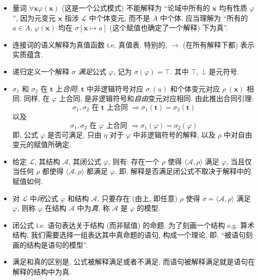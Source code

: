 \documentclass[a4paper]{article}
\begin{document}
\begin{itemize}
    \item 量词 $\forall \mathbf{x} \varphi(\mathbf{x})$ (这是一个公式模式) 不能解释为 ``论域中所有的 $\mathbf{x}$ 均有性质 $\varphi$'', 因为元变元 $\mathbf{x}$ 指涉 $\mathcal{L}$ 中个体变元, 而不是 $A$ 中个体. 应当理解为 ``所有的 $a\in A$, $\varphi(\mathbf{x})$ 均在 $\sigma[\mathbf{x}\mapsto a]$ (这个赋值也确定了一个解释) 下为真''.

    \item 连接词的语义解释为真值函数 i.e. 真值表. 特别的, $\to$ (在所有解释下都) 表示实质蕴含.

    \item 递归定义一个解释 $\sigma$ \emph{满足}公式 $\varphi$, 记为 $\sigma(\varphi) = \top$.
        其中 $\top$, $\bot$ 是元符号.

    \item $\sigma_1$ 和 $\sigma_2$ 在 $\mathbf{t}$ 上\emph{合同}: $\mathbf{t}$ 中非逻辑符号对应 $\sigma_{\cdot}(u)$ 和个体变元对应 $\rho_{\cdot}(\mathbf{x})$ 相同. 同样, 在 $\varphi$ 上合同, 是非逻辑符号和\emph{自由}变元对应相同.
        由此推出合同引理:\[
            \sigma_1, \sigma_2 \text{ 在 } \mathbf{t} \text{ 上合同 } \Rightarrow \sigma_1(\mathbf{t}) = \sigma_2(\mathbf{t})
        \]以及\[
            \sigma_1, \sigma_2 \text{ 在 } \varphi \text{ 上合同 } \Rightarrow \sigma_1(\varphi) = \sigma_2(\varphi)
        \]
        即, 公式 $\varphi$ 是否可满足, 只由 $\eta$ 对于 $\varphi$ 中非逻辑符号的解释, 以及 $\rho$ 中对自由变元的赋值所确定.

    \item 给定 $\mathcal{L}$, 其结构 $\mathcal{A}$, 其闭公式 $\varphi$,
        则有: 存在一个 $\rho$ 使得 $\langle \mathcal{A}, \rho\rangle$ 满足 $\varphi$, 当且仅当任何 $\rho$ 都使得 $\langle \mathcal{A}, \rho\rangle$ 都满足 $\varphi$.
        即, 解释是否满足闭公式不取决于解释中的赋值如何.

    \item 对 $\mathcal{L}$ 中\emph{闭}公式 $\varphi$ 和结构 $\mathcal{A}$, 只要存在 (由上, 即任意) $\rho$ 使得 $\sigma=\langle \mathcal{A}, \rho\rangle$ 满足 $\varphi$,
        则称 $\varphi$ 在结构 $\mathcal{A}$ 中为\emph{真}, 称 $\mathcal{A}$ 是 $\varphi$ 的模型.

    \item 闭公式 i.e. 语句表达关于结构 (而非赋值) 的命题.
        为了刻画一个结构 e.g. 算术结构, 我们需要选择一组表达其中真命题的语句, 构成一个理论.
        即, ``被语句刻画的结构是语句的模型''.

    \item 满足和真的区别是, 公式被解释满足或者不满足, 而语句被解释满足就是语句在解释的结构中为真.


\end{itemize}
\end{document}
